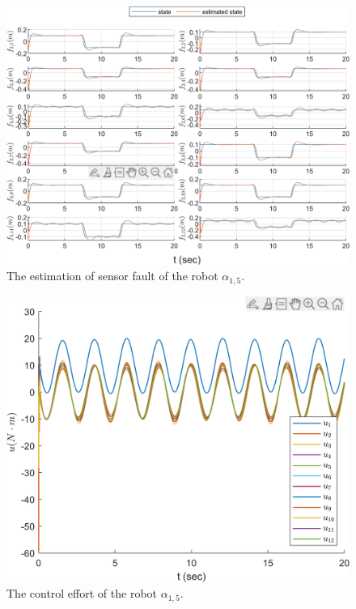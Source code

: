 \documentclass{ieeeaccess}
\begin{document}
\begin{figure}[htbp]
    \centering
    \includegraphics[scale=.57]{fig/robot (3).png}\caption{The estimation of sensor fault of the robot $\alpha_{1,5}$.}%
    \label{fig:robot, fs}
\end{figure}
\begin{figure}[htbp]
    \centering
    \includegraphics[scale=.57]{fig/robot (4).png}\caption{The control effort of the robot $\alpha_{1,5}$.}%
    \label{fig:robot, control}
\end{figure}
\end{document}
